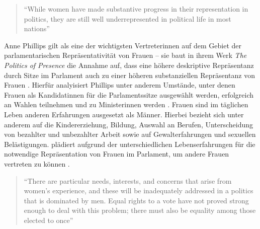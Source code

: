 \documentclass[12pt, 
    twoside=false, 
    bibliography=totoc, 
    numbers=endperiod, 
    headings=normal, 
    toc=chapterentrydotfill
    ]{scrbook}
\begin{document}
\citereset
\begin{quote}
    \enquote{While women have made substantive progress in their representation in politics, they are still well underrepresented in political life in most nations} \parencite[2]{coffe_2013}
\end{quote}



Anne Phillips gilt als eine der wichtigsten Vertreterinnen auf dem Gebiet der parlamentarischen Repräsentativität von Frauen -- sie baut in ihrem Werk \emph{The Politics of Presence} \parencite*{phillips_1998} die Annahme auf, dass eine höhere deskriptive Repräsentanz durch Sitze im Parlament auch zu einer höheren substanziellen Repräsentanz von Frauen \parencite[52]{wangnerud_2009}. Hierfür analyisiert Phillips unter anderem Umstände, unter denen Frauen als Kandidatinnen für die Parlamentssitze ausgewählt werden, erfolgreich an Wahlen teilnehmen und zu Ministerinnen werden \parencite[vgl.][416f.]{blaxill_2016}. Frauen sind im täglichen Leben anderen Erfahrungen ausgesetzt als Männer. Hierbei bezieht sich \textcite{phillips_1998} unter anderem auf die Kindererziehung, Bildung, Auswahl an Berufen, Unterscheidung von bezahlter und unbezahlter Arbeit sowie auf Gewalterfahrungen und sexuellen Belästigungen. \textcite{phillips_1998} plädiert aufgrund der unterschiedlichen Lebenserfahrungen für die notwendige Repräsentation von Frauen im Parlament, um andere Frauen vertreten zu können \parencite[vgl.][52]{wangnerud_2009}.

\citereset
\begin{quote}
    \enquote{There are particular needs, interests, and concerns that arise from women's experience, and these will be inadequately addressed in a politics that is dominated by men. Equal rights to a vote have not proved strong enough to deal with this problem; there must also be equality among those elected to once} \parencite[66]{phillips_1998}
\end{quote}
\end{document}
